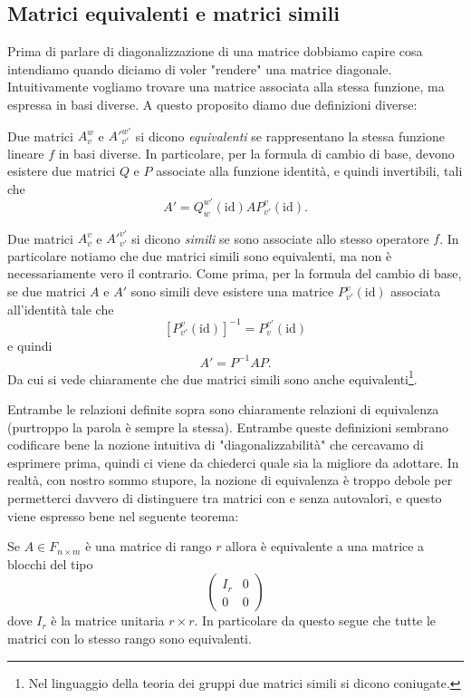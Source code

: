 \documentclass[11pt]{scrartcl}
\begin{document}
   	 \subsection{Matrici equivalenti e matrici simili}
   	 Prima di parlare di diagonalizzazione di una matrice dobbiamo capire cosa intendiamo quando diciamo di voler "rendere" una matrice diagonale. Intuitivamente vogliamo trovare una matrice associata alla stessa funzione, ma espressa in basi diverse. A questo proposito diamo due definizioni diverse:
   	 \begin{definition}
   	 	Due matrici $A_v^w$ e ${A'}_{v'}^{w'}$ si dicono \textit{equivalenti} se rappresentano la stessa funzione lineare $f$ in basi diverse. In particolare, per la formula di cambio di base, devono esistere due matrici $Q$ e $P$ associate alla funzione identità, e quindi invertibili, tali che 
   	 	$$A'=Q_{w}^{w'}(\text{id})AP_{v'}^{v}(\text{id}).$$
   	 \end{definition}
   	 \begin{definition}
   	 	Due matrici $A_v^v$ e ${A'}_{v'}^{v'}$ si dicono \textit{simili} se sono associate allo stesso operatore $f$. In particolare notiamo che due matrici simili sono equivalenti, ma non è necessariamente vero il contrario. Come prima, per la formula del cambio di base, se due matrici $A$ e $A'$ sono simili deve esistere una matrice $P_{v'}^{v}(\text{id})$ associata all'identità tale che
   	 	$$\left[P_{v'}^v(\text{id})\right]^{-1}=P_{v}^{v'}(\text{id})$$
   	 	e quindi
   	 	$$A'=P^{-1}AP.$$
   	 	Da cui si vede chiaramente che due matrici simili sono anche equivalenti\footnote{Nel linguaggio della teoria dei gruppi due matrici simili si dicono coniugate.}.
   	 \end{definition}
   	 Entrambe le relazioni definite sopra sono chiaramente relazioni di equivalenza (purtroppo la parola è sempre la stessa). Entrambe queste definizioni sembrano codificare bene la nozione intuitiva di "diagonalizzabilità" che cercavamo di esprimere prima, quindi ci viene da chiederci quale sia la migliore da adottare. In realtà, con nostro sommo stupore, la nozione di equivalenza è troppo debole per permetterci davvero di distinguere tra matrici con e senza autovalori, e questo viene espresso bene nel seguente teorema:
   	 \begin{theorem}
   	 	Se $A\in F_{n\times m}$ è una matrice di rango $r$ allora è equivalente a una matrice a blocchi del tipo
   	 	$$
   	 	\left(
   	 	\begin{array}{c|c}
   	 		I_r & 0 \\
   	 		\hline 
   	 		0   & 0
   	 	\end{array}
   	 	\right)
   	 	$$
   	 	dove $I_r$ è la matrice unitaria $r\times r$. In particolare da questo segue che tutte le matrici con lo stesso rango sono equivalenti.
   	 \end{theorem}
\end{document}
